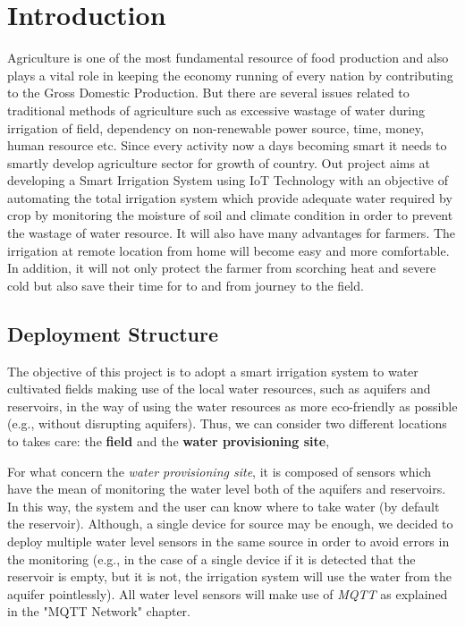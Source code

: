 \section{Introduction}
Agriculture is one of the most fundamental resource of food production and also plays a vital role in keeping the economy running of every nation by contributing to the Gross Domestic Production. But there are several issues related to traditional methods of agriculture such as excessive wastage of water during irrigation of field, dependency on non-renewable power source, time, money, human resource etc. Since every activity now a days becoming smart it needs to smartly develop agriculture sector for growth of country. Out project aims at developing a Smart Irrigation System using IoT Technology with an objective of automating the total irrigation system which provide adequate water required by crop by monitoring the moisture of soil and climate condition in order to prevent the wastage of water resource. It will also have many advantages for farmers. The irrigation at remote location from home will become easy and more comfortable. In addition, it will not only protect the farmer from scorching heat and severe cold but also save their time for to and from journey to the field.



\subsection{Deployment Structure}
The objective of this project is to adopt a smart irrigation system to water cultivated fields making use of the local water resources, such as aquifers and reservoirs, in the way of using the water resources as more eco-friendly as possible (e.g., without disrupting aquifers). Thus, we can consider two different locations to takes care: the \textbf{field} and the \textbf{water provisioning site},

For what concern the \textit{water provisioning site}, it is composed of sensors which have the mean of monitoring the water level both of the aquifers and reservoirs. In this way, the system and the user can know where to take water (by default the reservoir). Although, a single device for source may be enough, we decided to deploy multiple water level sensors in the same source in order to avoid errors in the monitoring (e.g., in the case of a single device if it is detected that the reservoir is empty, but it is not, the irrigation system will use the water from the aquifer pointlessly).
All water level sensors will make use of \textit{MQTT} as explained in the "MQTT Network" chapter.


